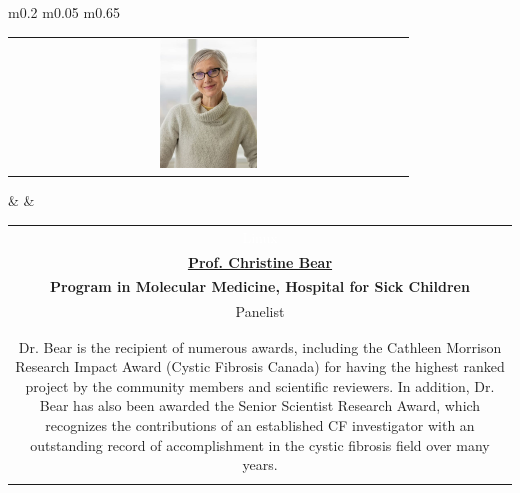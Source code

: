 \documentclass[titlepage,oneside,openany,10pt]{book}
\begin{document}
\begin{tabular}{  m{0.2\textwidth}  m{0.05\textwidth}  m{0.65\textwidth}  }
\toprule
\begin{tabular}[c]{@{}c@{}} 
\includegraphics[width=0.25\textwidth]{Other_Figures/CBear.png} 
\end{tabular}		& 		
& \begin{tabular}[c]{@{}c@{}}
\textcolor{white}{Linux}\\
\textbf{\underline{Prof. Christine Bear}}\\
\textbf{Program in Molecular Medicine, Hospital for Sick Children}\\
Panelist\\\\
\begin{tabularx}{\linewidth}{@{}XXX@{}}
Dr. Christine Bear is a senior scientist at the Hospital for Sick Children, and holds a professor position in the Department of Biochemistry at the University of Toronto. The work of the Bear lab has recently provided direct evidence that CFTR acts as a phosphorylation and ATP-regulated chloride channel and have also characterized the functional properties of CF-causing mutations. Her discovery was a significant step towards developing effective therapeutics against Cystic Fibrosis.  Currently, Dr. Bear's research focuses on developing chemical-biology approaches to define molecular lesions caused by CF-associated mutations, in the hopes of identifying molecular targets for therapeutics.\\
\qquad Dr. Bear is the recipient of numerous awards, including the Cathleen Morrison Research Impact Award (Cystic Fibrosis Canada) for having the highest ranked project by the community members and scientific reviewers. In addition, Dr. Bear has also been awarded the Senior Scientist Research Award, which recognizes the contributions of an established CF investigator with an outstanding record of accomplishment in the cystic fibrosis field over many years.\\

\end{tabularx}
\end{tabular}
\end{tabular}
\end{document}
